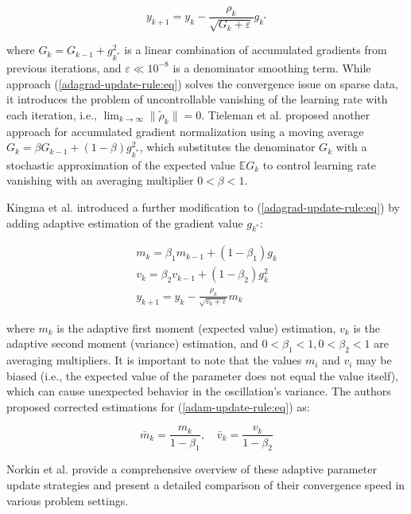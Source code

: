 \begin{equation}
    \label{adagrad-update-rule:eq}
        y_{k+1} = y_k - \frac{\rho_k}{\sqrt{G_k + \varepsilon}} g_{k^*}
\end{equation}

\noindent where $G_k = G_{k-1} + g_{k^*}^2$ is a linear combination of accumulated gradients from previous iterations, and $\varepsilon \ll 10^{-8}$ is a denominator smoothing term. While approach (\ref{adagrad-update-rule:eq}) solves the convergence issue on sparse data, it introduces the problem of uncontrollable vanishing of the learning rate with each iteration, i.e., $\lim_{k \to \infty} \| \tilde{\rho}_k \| = 0$. Tieleman et al. \cite{tieleman2012rmsprop} proposed another approach for accumulated gradient normalization using a moving average $G_k = \beta G_{k-1} + (1 - \beta) g_{k^*}^2$, which substitutes the denominator $G_k$ with a stochastic approximation of the expected value $\mathbb{E} G_k$ to control learning rate vanishing with an averaging multiplier $0 < \beta < 1$.

Kingma et al. \cite{kingma2017adam} introduced a further modification to (\ref{adagrad-update-rule:eq}) by adding adaptive estimation of the gradient value $g_{k^*}$:

\begin{eqnarray}
    \label{adam-update-rule:eq}
        m_k = \beta_1 m_{k-1} + (1 - \beta_1) g_k \nonumber \\
        v_k = \beta_2 v_{k-1} + (1 - \beta_2) g_k^2 \nonumber \\
        y_{k+1} = y_k - \frac{\rho_k}{\sqrt{v_k + \varepsilon}} m_k
\end{eqnarray}

\noindent where $m_k$ is the adaptive first moment (expected value) estimation, $v_k$ is the adaptive second moment (variance) estimation, and $0 < \beta_1 < 1, 0 < \beta_2 < 1$ are averaging multipliers. It is important to note that the values $m_i$ and $v_i$ may be biased (i.e., the expected value of the parameter does not equal the value itself), which can cause unexpected behavior in the oscillation's variance. The authors proposed corrected estimations for (\ref{adam-update-rule:eq}) as:

\begin{equation}
    \label{adam-corrected-estimations:eq}
        \bar{m}_k = \frac{m_k}{1 - \beta_1}, \quad \bar{v}_k = \frac{v_k}{1 - \beta_2}
\end{equation}

Norkin et al. \cite{Norkin_Kozyriev_Norkin_2024} provide a comprehensive overview of these adaptive parameter update strategies and present a detailed comparison of their convergence speed in various problem settings.
